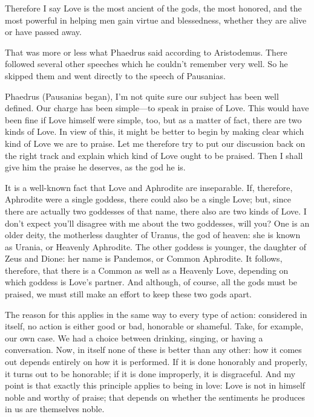 Therefore I say Love is the most ancient of the gods, the most honored,
and the most powerful in helping men gain virtue and blessedness,
whether they are alive or have passed away.

That was more or less what Phaedrus said according to Aristodemus.
 There followed several other speeches which he couldn’t remember
very well. So he skipped them and went directly to the speech of
Pausanias.

\blank[line]

Phaedrus (Pausanias began), I’m not quite sure our subject has been well
defined. Our charge has been simple---to speak in praise of Love. This
would have been fine if Love himself were simple, too, but as a matter
of fact, there are two kinds of Love. In view of this, it might be
better to begin by making clear which kind of Love we are to praise. Let
me therefore  try to put our discussion back on the right track
and explain which kind of Love ought to be praised. Then I shall give
him the praise he deserves, as the god he is.

It is a well-known fact that Love and Aphrodite are inseparable. If,
therefore, Aphrodite were a single goddess, there could also be a single
Love; but, since there are actually two goddesses of that name, there
also are two kinds of Love. I don’t expect you’ll disagree with me about
the two goddesses, will you? One is an older deity, the motherless
daughter of Uranus, the god of heaven: she is known as Urania, or
Heavenly Aphrodite. The other goddess is younger, the daughter of Zeus
and Dione: her name is Pandemos, or Common Aphrodite. It follows,
therefore, that there  is a Common as well as a Heavenly Love,
depending on which goddess is Love’s partner. And although, of course,
all the gods must be praised, we must still make an effort to keep these
two gods apart.

The reason for this applies in the same way to every type of action:
considered in itself, no action is either good or bad, honorable or
shameful.  Take, for example, our own case. We had a
choice between drinking, singing, or having a conversation. Now, in
itself none of these is better than any other: how it comes out depends
entirely on how it is performed. If it is done honorably and properly,
it turns out to be honorable; if it is done improperly, it is
disgraceful. And my point is that exactly this principle applies to
being in love: Love is not in himself noble and worthy of praise; that
depends on whether the sentiments he produces in us are themselves
noble.

